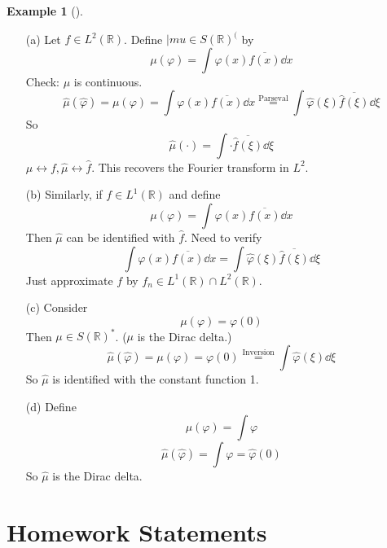 \documentclass{article}
\theoremstyle{definition}
\newtheorem{ex}{Example}
\newenvironment{exs}[1][]{%
  \begin{ex}[#1]$ $\par\nobreak\ignorespaces
}{%
  \end{ex}
}
\newcommand{\RR}{\mathbb R}
\begin{document}
\begin{exs}
	\begin{enumerate}
		\item[(a)] Let $f \in L^2(\RR)$.
			Define $|mu \in S(\RR)^($ by 
			\[
				\mu(\varphi) = \int \varphi(x) \overline{f(x)} \dd{x}
			\]
			Check: $\mu$ is continuous.
			\[
				\widehat{\mu}(\widehat{\varphi}) = \mu(\varphi) = \int \varphi(x) \overline{f(x)} \dd{x} \stackrel{\text{Parseval}}{=} \int \widehat{\varphi}(\xi) \overline{\widehat{f}(\xi)} \dd{\xi}
			\]
			So 
			\[
				\widehat{\mu}(\cdot) = \int \cdot \overline{\widehat{f}(\xi)} \dd{\xi}
			\]
			$\mu \leftrightarrow f, \widehat{\mu} \leftrightarrow \widehat{f}$.
			This recovers the Fourier transform in $L^2$.

		\item[(b)] Similarly, if $f \in L^1(\RR)$ and define 
			\[
				\mu(\varphi) = \int \varphi(x) \overline{f(x)} \dd{x}
			\]
			Then $\widehat{\mu}$ can be identified with $\widehat{f}$.
			Need to verify
			\[
				\int \varphi(x) \overline{f(x)} \dd{x} = \int \widehat{\varphi}(\xi) \overline{\widehat{f}(\xi)} \dd{\xi}
			\]
			Just approximate $f$ by $f_n \in L^1(\RR) \cap L^2(\RR)$.
			
		\item[(c)] Consider 
			\[
				\mu(\varphi) = \varphi(0)
			\]
			Then $\mu \in S(\RR)^*$. 
			($\mu$ is the Dirac delta.)
			\[
				\widehat{\mu}(\widehat{\varphi}) = \mu(\varphi) = \varphi(0) \stackrel{\text{Inversion}}{=} \int \widehat{\varphi}(\xi) \dd{\xi}
			\]
			So $\widehat{\mu}$ is identified with the constant function 1.

		\item[(d)] Define 
			\[
				\mu(\varphi) = \int \varphi
			\]
			\[
				\widehat{\mu}(\widehat{\varphi}) = \int \varphi = \widehat{\varphi}(0)
			\]
			So $\widehat{\mu}$ is the Dirac delta.
	\end{enumerate}
\end{exs}

\newpage

\section{Homework Statements}
\end{document}

